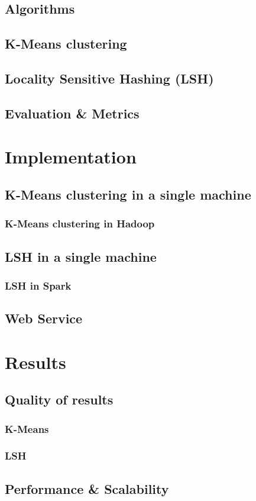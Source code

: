 \documentclass[11pt,a4paper,twoside]{scrartcl}
\begin{document}
    \subsection{Algorithms}
      \subsection{K-Means clustering}
      \subsection{Locality Sensitive Hashing (LSH)}
    \subsection{Evaluation \& Metrics}
  \section{Implementation}
    \subsection{K-Means clustering in a single machine}
      \subsubsection{K-Means clustering in Hadoop}
    \subsection{LSH in a single machine}
      \subsubsection{LSH in Spark}
    \subsection{Web Service}
  \section{Results}
    \subsection{Quality of results}
      \subsubsection{K-Means}
      \subsubsection{LSH}
    \subsection{Performance \& Scalability}
  
\end{document}
